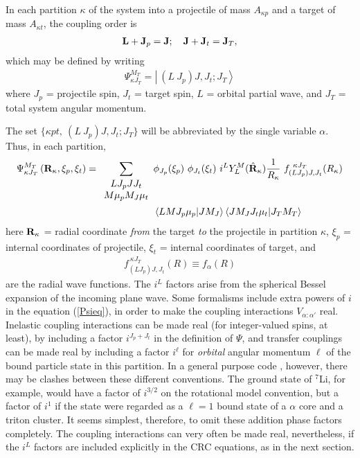 \documentclass[11pt,a4paper]{article}
\newcommand{\vecR}{{\bf R}}
\newcommand{\vecL}{{\bf L}}
\newcommand{\vecJ}{{\bf J}}
\begin{document}
In each partition $\kappa$ of the system into a projectile of mass
$ A_{\kappa p}$ and a target of mass $ A_{\kappa t} $,
the coupling order is
\begin{eqnarray} \label{spinrep}
  \vecL + \vecJ_p = \vecJ ;~~~ \vecJ + \vecJ_t =  \vecJ_T ,
\end{eqnarray}
which may be defined by writing
\begin{eqnarray}
 \Psi_{\kappa J_T}^{M_T} =
  \left | ~(L~J_p )J, J_t ; J_T \right\rangle
\end{eqnarray}
where
$ J_p$
= projectile spin,
$ J_t$
= target spin,
$ L$
= orbital partial wave, and
$ J_T$
= total system angular momentum.

The set $\{\kappa pt,~(L~J_p )J, J_t ; J_T \} $
will be abbreviated by the single variable $\alpha$.
Thus, in each partition,
\begin{eqnarray} \nonumber
\Psi_{\kappa J_T}^{M_T}
   \left ( \vecR_\kappa , \xi_p , \xi_t \right )=
 \sum_{\begin{array}{cc}L J_p J J_t\\M \mu_p M_J \mu_t\end{array}}
  & \phi_{J_p} ( \xi_p )~\phi_{J_t} ( \xi_t )~
      i^L Y_L^M ({\hat \vecR_\kappa} ) {1 \over {R_\kappa}} ~
        f^{~\kappa J_T}_{(LJ_p )J,J_t} (R_\kappa)
\\
&  \left\langle LM J_p \mu_p | JM_J \right\rangle
        \left\langle JM_J  J_t \mu_t | J_T M_T \right\rangle\label{Psieq}
\end{eqnarray}
here $ \vecR_\kappa $
= radial coordinate {\em from} the target {\em to} the projectile
in partition $\kappa$, $ \xi_p$
= internal coordinates of projectile,
$ \xi_t$
= internal coordinates of target, and
\begin{eqnarray}
f^{~\kappa J_T}_{(LJ_p )J,J_t} (R)
 \equiv f _\alpha (R)
\end{eqnarray}
are the radial wave functions.
The $i^L$ factors arise from the spherical Bessel expansion of the
incoming plane wave.  Some formalisms include extra powers of $i$
in the equation (\ref{Psieq}), in order to make the coupling interactions
$V_{\alpha :\alpha'} $ real.
Inelastic coupling interactions can be made real (for integer-valued spins,
at least), by including a factor $i^{J_p + J_t} $ in the
definition of $\Psi$, and transfer couplings can be made real by including
a factor $i^ \ell $ for {\em orbital} angular momentum
$\ell$ of the bound particle state in this partition.
In a general purpose code \cite{FRESCO}, however,
there may be clashes between these different conventions. The ground state
of $^7$Li, for example, would have a factor of $i^ {3/2} $
on the rotational model convention, but a factor of $ i^1 $
if the state were regarded as a $ \ell = 1 $ bound state of a $\alpha$ core
and a triton cluster.
It seems simplest, therefore, to omit these addition phase factors completely.
The coupling interactions can very often be made real, nevertheless,
if the $ i ^ L $ factors are included explicitly in the CRC equations,
as in the next section.
\end{document}
